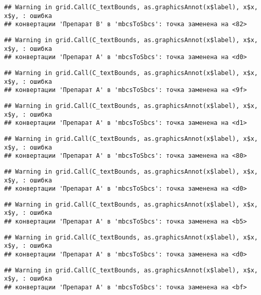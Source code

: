 \documentclass[
]{article}
\begin{document}
\begin{verbatim}
## Warning in grid.Call(C_textBounds, as.graphicsAnnot(x$label), x$x, x$y, : ошибка
## конвертации 'Препарат B' в 'mbcsToSbcs': точка заменена на <82>
\end{verbatim}

\begin{verbatim}
## Warning in grid.Call(C_textBounds, as.graphicsAnnot(x$label), x$x, x$y, : ошибка
## конвертации 'Препарат A' в 'mbcsToSbcs': точка заменена на <d0>
\end{verbatim}

\begin{verbatim}
## Warning in grid.Call(C_textBounds, as.graphicsAnnot(x$label), x$x, x$y, : ошибка
## конвертации 'Препарат A' в 'mbcsToSbcs': точка заменена на <9f>
\end{verbatim}

\begin{verbatim}
## Warning in grid.Call(C_textBounds, as.graphicsAnnot(x$label), x$x, x$y, : ошибка
## конвертации 'Препарат A' в 'mbcsToSbcs': точка заменена на <d1>
\end{verbatim}

\begin{verbatim}
## Warning in grid.Call(C_textBounds, as.graphicsAnnot(x$label), x$x, x$y, : ошибка
## конвертации 'Препарат A' в 'mbcsToSbcs': точка заменена на <80>
\end{verbatim}

\begin{verbatim}
## Warning in grid.Call(C_textBounds, as.graphicsAnnot(x$label), x$x, x$y, : ошибка
## конвертации 'Препарат A' в 'mbcsToSbcs': точка заменена на <d0>
\end{verbatim}

\begin{verbatim}
## Warning in grid.Call(C_textBounds, as.graphicsAnnot(x$label), x$x, x$y, : ошибка
## конвертации 'Препарат A' в 'mbcsToSbcs': точка заменена на <b5>
\end{verbatim}

\begin{verbatim}
## Warning in grid.Call(C_textBounds, as.graphicsAnnot(x$label), x$x, x$y, : ошибка
## конвертации 'Препарат A' в 'mbcsToSbcs': точка заменена на <d0>
\end{verbatim}

\begin{verbatim}
## Warning in grid.Call(C_textBounds, as.graphicsAnnot(x$label), x$x, x$y, : ошибка
## конвертации 'Препарат A' в 'mbcsToSbcs': точка заменена на <bf>
\end{verbatim}
\end{document}
